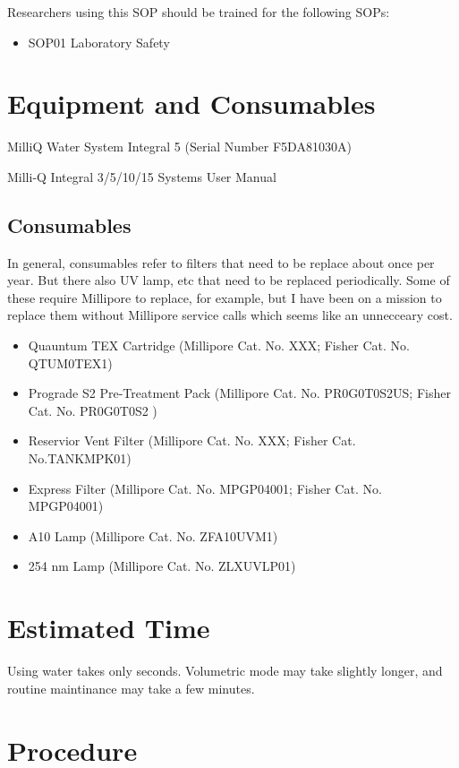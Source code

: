 \documentclass[12pt]{../SOP3_beta}\usepackage[]{graphicx}\usepackage[]{color}
\begin{document}
\NP Researchers using this SOP should be trained for the following SOPs:

\begin{itemize}
  \item SOP01 Laboratory Safety
\end{itemize}

\section{Equipment and Consumables}

\NP MilliQ Water System Integral 5 (Serial Number F5DA81030A)

\NP Milli-Q Integral 3/5/10/15 Systems User Manual

\subsection{Consumables}

In general, consumables refer to filters that need to be replace about once per year. But there also UV lamp, etc that need to be replaced periodically. Some of these require Millipore to replace, for example, but I have been on a mission to replace them without Millipore service calls which seems like an unnecceary cost.

\begin{itemize}
  \item Quauntum TEX Cartridge (Millipore Cat. No. XXX; Fisher Cat. No. QTUM0TEX1)
  \item Prograde S2 Pre-Treatment Pack (Millipore Cat. No. PR0G0T0S2US; Fisher Cat. No. PR0G0T0S2 ) 
  \item Reservior Vent Filter (Millipore Cat. No. XXX; Fisher Cat. No.TANKMPK01)
  \item Express Filter (Millipore Cat. No. MPGP04001; Fisher Cat. No. MPGP04001)
  \item A10 Lamp (Millipore Cat. No. ZFA10UVM1)
  \item 254 nm Lamp (Millipore Cat. No. ZLXUVLP01)
\end{itemize}


\section{Estimated Time}

\NP Using water takes only seconds. Volumetric mode may take slightly longer, and routine maintinance may take a few minutes. 

\section{Procedure}
\end{document}
